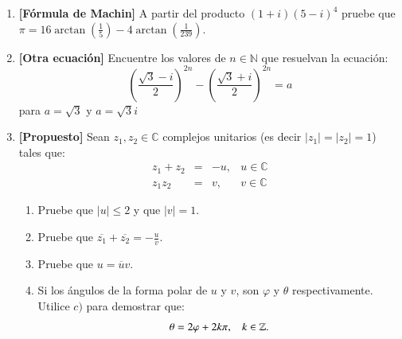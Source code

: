 \documentclass[letterpaper,10pt]{article}
\newcommand{\N}{\mathbb N}
\newcommand{\Z}{\mathbb Z}
\newcommand{\C}{\mathbb C}
\theoremstyle{plain}
\begin{document}
\begin{enumerate}[\bf P1.]
\item \textbf{[Fórmula de Machin]} A partir del producto $(1+i)(5-i)^4$ pruebe que $ \pi = 16\arctan \left(\frac{1}{5}\right) - 4\arctan \left(\frac{1}{239}\right)$.

\item \textbf{[Otra ecuación]} Encuentre los valores de $n\in \N$ que resuelvan la ecuación:
$$\left(\dfrac{\sqrt{3}-i}{2}\right)^{2n}-\left(\dfrac{\sqrt{3}+i}{2}\right)^{2n} =a$$
para $a=\sqrt{3}$ y $a=\sqrt{3}i$

\item \textbf{[Propuesto]}%
Sean $z_1,z_2 \in \C$ complejos unitarios (es decir $|z_1|=|z_2|=1$) tales que:
$$
\begin{array}{rclr}
z_1+z_2 & = & -u, & u \in \C \\
z_1 z_2 & = & v, & v \in \C
\end{array}
$$
\begin{enumerate}
	\item Pruebe que $|u|\leq 2$ y que $|v|=1$.
	\item Pruebe que $\displaystyle\overline{z_1}+\overline{z_2}=- \frac{u}{v}$.
	\item Pruebe que $u=\overline{u}v$.
	\item Si los ángulos de la forma polar de $u$ y $v$, son $\varphi$ y $\theta$ respectivamente. Utilice $c)$ para demostrar que:
	$$
	\theta = 2 \varphi + 2k\pi , \hspace{3 mm} k \in \Z. 
	$$
\end{enumerate}


\end{enumerate}
\end{document}
